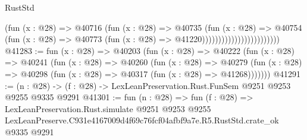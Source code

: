 \begin{lexlean}{RustStd}
\begin{coremodule}
                                          (fun (x : @28) =>
                                          @40716
                                            (fun (x : @28) =>
                                            @40735
                                              (fun (x : @28) =>
                                              @40754
                                                (fun (x : @28) =>
                                                @40773
                                                  (fun (x : @28) => @41220))))))))))))))))))))))))
@41283 := fun (x : @28) =>
  @40203
    (fun (x : @28) =>
    @40222
      (fun (x : @28) =>
      @40241
        (fun (x : @28) =>
        @40260
          (fun (x : @28) =>
          @40279 (fun (x : @28) => @40298 (fun (x : @28) => @40317 (fun (x : @28) => @41268)))))))
@41291 := (n : @28) -> (f : @28) -> LexLeanPreservation.Rust.FunSem @9251 @9253 @9255 @9335 @9291
@41301 := fun (n : @28) =>
  fun (f : @28) =>
  LexLeanPreservation.Rust.simulate
    @9251
    @9253
    @9255
    LexLeanPreserve.C931e4167009d4f69c76fcf04afbf9a7e.R5.RustStd.crate_ok
    @9335
    @9291
\end{coremodule}
\end{lexlean}
